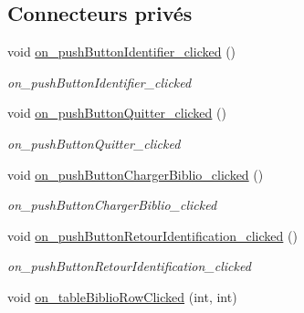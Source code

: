 \subsection*{Connecteurs privés}
\begin{DoxyCompactItemize}
\item 
\mbox{\label{classAppMainWindow_adedddb04ee07d7d8099ee92d70194cd2}} 
void \hyperlink{classAppMainWindow_adedddb04ee07d7d8099ee92d70194cd2}{on\+\_\+push\+Button\+Identifier\+\_\+clicked} ()
\begin{DoxyCompactList}\small\item\em on\+\_\+push\+Button\+Identifier\+\_\+clicked \end{DoxyCompactList}\item 
\mbox{\label{classAppMainWindow_a55feb1b5e485c1b3a46c2426edf64b4e}} 
void \hyperlink{classAppMainWindow_a55feb1b5e485c1b3a46c2426edf64b4e}{on\+\_\+push\+Button\+Quitter\+\_\+clicked} ()
\begin{DoxyCompactList}\small\item\em on\+\_\+push\+Button\+Quitter\+\_\+clicked \end{DoxyCompactList}\item 
\mbox{\label{classAppMainWindow_a807f1d4b6f2376f4fae0757b8ae17934}} 
void \hyperlink{classAppMainWindow_a807f1d4b6f2376f4fae0757b8ae17934}{on\+\_\+push\+Button\+Charger\+Biblio\+\_\+clicked} ()
\begin{DoxyCompactList}\small\item\em on\+\_\+push\+Button\+Charger\+Biblio\+\_\+clicked \end{DoxyCompactList}\item 
\mbox{\label{classAppMainWindow_aaabff27d6afcec8f01dd07b0c3569c53}} 
void \hyperlink{classAppMainWindow_aaabff27d6afcec8f01dd07b0c3569c53}{on\+\_\+push\+Button\+Retour\+Identification\+\_\+clicked} ()
\begin{DoxyCompactList}\small\item\em on\+\_\+push\+Button\+Retour\+Identification\+\_\+clicked \end{DoxyCompactList}\item 
\mbox{\label{classAppMainWindow_af642437ed056c378f1bd23afdf57dd46}} 
void \hyperlink{classAppMainWindow_af642437ed056c378f1bd23afdf57dd46}{on\+\_\+table\+Biblio\+Row\+Clicked} (int, int)

\end{DoxyCompactItemize}
